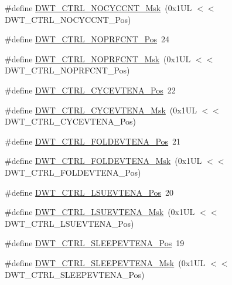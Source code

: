 \begin{DoxyCompactItemize}
\item 
\#define \hyperlink{group___c_m_s_i_s___d_w_t_gaf40c8d7a4fd978034c137e90f714c143}{D\+W\+T\+\_\+\+C\+T\+R\+L\+\_\+\+N\+O\+C\+Y\+C\+C\+N\+T\+\_\+\+Msk}~(0x1\+U\+L $<$$<$ D\+W\+T\+\_\+\+C\+T\+R\+L\+\_\+\+N\+O\+C\+Y\+C\+C\+N\+T\+\_\+\+Pos)
\item 
\#define \hyperlink{group___c_m_s_i_s___d_w_t_gad52a0e5be84363ab166cc17beca0d048}{D\+W\+T\+\_\+\+C\+T\+R\+L\+\_\+\+N\+O\+P\+R\+F\+C\+N\+T\+\_\+\+Pos}~24
\item 
\#define \hyperlink{group___c_m_s_i_s___d_w_t_gafd8448d7db4bc51f27f202e6e1f27823}{D\+W\+T\+\_\+\+C\+T\+R\+L\+\_\+\+N\+O\+P\+R\+F\+C\+N\+T\+\_\+\+Msk}~(0x1\+U\+L $<$$<$ D\+W\+T\+\_\+\+C\+T\+R\+L\+\_\+\+N\+O\+P\+R\+F\+C\+N\+T\+\_\+\+Pos)
\item 
\#define \hyperlink{group___c_m_s_i_s___d_w_t_ga0cb0640aaeb18a626d7823570d5c3cb6}{D\+W\+T\+\_\+\+C\+T\+R\+L\+\_\+\+C\+Y\+C\+E\+V\+T\+E\+N\+A\+\_\+\+Pos}~22
\item 
\#define \hyperlink{group___c_m_s_i_s___d_w_t_ga40554bd81460e39abf08810f45fac1a2}{D\+W\+T\+\_\+\+C\+T\+R\+L\+\_\+\+C\+Y\+C\+E\+V\+T\+E\+N\+A\+\_\+\+Msk}~(0x1\+U\+L $<$$<$ D\+W\+T\+\_\+\+C\+T\+R\+L\+\_\+\+C\+Y\+C\+E\+V\+T\+E\+N\+A\+\_\+\+Pos)
\item 
\#define \hyperlink{group___c_m_s_i_s___d_w_t_ga5602b0707f446ce78d88ff2a3a82bfff}{D\+W\+T\+\_\+\+C\+T\+R\+L\+\_\+\+F\+O\+L\+D\+E\+V\+T\+E\+N\+A\+\_\+\+Pos}~21
\item 
\#define \hyperlink{group___c_m_s_i_s___d_w_t_ga717e679d775562ae09185a3776b1582f}{D\+W\+T\+\_\+\+C\+T\+R\+L\+\_\+\+F\+O\+L\+D\+E\+V\+T\+E\+N\+A\+\_\+\+Msk}~(0x1\+U\+L $<$$<$ D\+W\+T\+\_\+\+C\+T\+R\+L\+\_\+\+F\+O\+L\+D\+E\+V\+T\+E\+N\+A\+\_\+\+Pos)
\item 
\#define \hyperlink{group___c_m_s_i_s___d_w_t_gaea5d1ee72188dc1d57b54c60a9f5233e}{D\+W\+T\+\_\+\+C\+T\+R\+L\+\_\+\+L\+S\+U\+E\+V\+T\+E\+N\+A\+\_\+\+Pos}~20
\item 
\#define \hyperlink{group___c_m_s_i_s___d_w_t_gac47427f455fbc29d4b6f8a479169f2b2}{D\+W\+T\+\_\+\+C\+T\+R\+L\+\_\+\+L\+S\+U\+E\+V\+T\+E\+N\+A\+\_\+\+Msk}~(0x1\+U\+L $<$$<$ D\+W\+T\+\_\+\+C\+T\+R\+L\+\_\+\+L\+S\+U\+E\+V\+T\+E\+N\+A\+\_\+\+Pos)
\item 
\#define \hyperlink{group___c_m_s_i_s___d_w_t_ga9c6d62d121164013a8e3ee372f17f3e5}{D\+W\+T\+\_\+\+C\+T\+R\+L\+\_\+\+S\+L\+E\+E\+P\+E\+V\+T\+E\+N\+A\+\_\+\+Pos}~19
\item 
\#define \hyperlink{group___c_m_s_i_s___d_w_t_ga2f431b3734fb840daf5b361034856da9}{D\+W\+T\+\_\+\+C\+T\+R\+L\+\_\+\+S\+L\+E\+E\+P\+E\+V\+T\+E\+N\+A\+\_\+\+Msk}~(0x1\+U\+L $<$$<$ D\+W\+T\+\_\+\+C\+T\+R\+L\+\_\+\+S\+L\+E\+E\+P\+E\+V\+T\+E\+N\+A\+\_\+\+Pos)

\end{DoxyCompactItemize}
